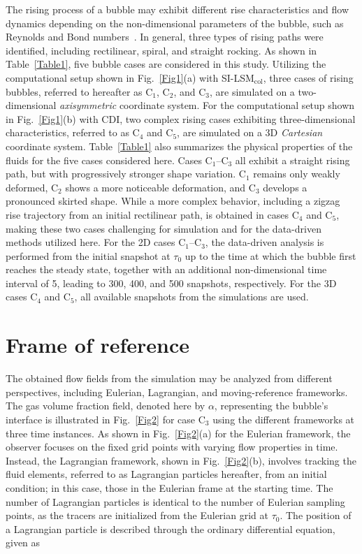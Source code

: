 \documentclass[a4paper,fleqn]{cas-sc}
\begin{document}
	The rising process of a bubble may exhibit different rise characteristics and flow dynamics depending on the non-dimensional parameters of the bubble, such as Reynolds and Bond numbers~\cite{Cano-Lozano2016, Hua2007}. In general, three types of rising paths were identified, including rectilinear, spiral, and straight rocking. As shown in Table~\ref{Table1}, five bubble cases are considered in this study. Utilizing the computational setup shown in Fig.~\ref{Fig1}(a) with SI-LSM$_{\text{col}}$, three cases of rising bubbles, referred to hereafter as C$_1$, C$_2$, and C$_3$, are simulated on a two-dimensional \textit{axisymmetric} coordinate system. For the computational setup shown in Fig.~\ref{Fig1}(b) with CDI, two complex rising cases exhibiting three-dimensional characteristics, referred to as C$_4$ and C$_5$, are simulated on a 3D \textit{Cartesian} coordinate system. Table~\ref{Table1} also summarizes the physical properties of the fluids for the five cases considered here. Cases C$_1$--C$_3$ all exhibit a straight rising path, but with progressively stronger shape variation. C$_1$ remains only weakly deformed, C$_2$ shows a more noticeable deformation, and C$_3$ develops a pronounced skirted shape. While a more complex behavior, including a zigzag rise trajectory from an initial rectilinear path, is obtained in cases C$_4$ and C$_5$, making these two cases challenging for simulation and for the data-driven methods utilized here. For the 2D cases C$_1$--C$_3$, the data-driven analysis is performed from the initial snapshot at $\tau_0$ up to the time at which the bubble first reaches the steady state, together with an additional non-dimensional time interval of 5, leading to 300, 400, and 500 snapshots, respectively. For the 3D cases C$_4$ and C$_5$, all available snapshots from the simulations are used.
	
	\section{Frame of reference}
	\label{Framework}
	
	The obtained flow fields from the simulation may be analyzed from different perspectives, including Eulerian, Lagrangian, and moving-reference frameworks. The gas volume fraction field, denoted here by $\alpha$, representing the bubble's interface is illustrated in Fig.~\ref{Fig2} for case C$_3$ using the different frameworks at three time instances. As shown in Fig.~\ref{Fig2}(a) for the Eulerian framework, the observer focuses on the fixed grid points with varying flow properties in time. Instead, the Lagrangian framework, shown in Fig.~\ref{Fig2}(b), involves tracking the fluid elements, referred to as Lagrangian particles hereafter, from an initial condition; in this case, those in the Eulerian frame at the starting time. The number of Lagrangian particles is identical to the number of Eulerian sampling points, as the tracers are initialized from the Eulerian grid at $\tau_0$. The position of a Lagrangian particle is described through the ordinary differential equation, given as
	
\end{document}
